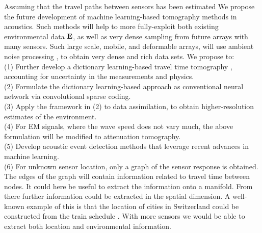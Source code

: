 Assuming that the travel paths between sensors has been estimated\cite{sabra2005,gerstoft2006} We propose the future development of machine learning-based tomography methods in acoustics. Such methods will help to more fully-exploit both existing environmental data $\bf E$, as well as very dense sampling from future arrays with many sensors. Such large scale, mobile, and deformable arrays, will use ambient noise processing \cite{sabra2005}, to obtain very dense and rich data sets. We propose  to: \\
(1) Further develop a dictionary learning-based travel time tomography \cite{bianco2018}, accounting for uncertainty in the measurements and physics. \\
(2) Formulate the dictionary learning-based approach as conventional neural network via convolutional sparse coding. \\
(3) Apply the framework in (2) to  data assimilation, to obtain higher-resolution estimates of the environment. \\
(4) For EM signals, where the wave speed does not vary much, the above formulation will be modified to  attenuation tomography.\\
(5) Develop acoustic event detection methods that leverage recent advances in machine learning.\\
(6) For unknown sensor location, only a graph of the sensor response is obtained. The edges of the graph will contain information related to travel time between nodes. It could here be useful to extract the information onto a manifold. From there further information could be extracted in the spatial dimension. A well-known example of this is that the location of cities in Switzerland could be constructed from the train schedule \cite{dokmanic2015}. With more sensors we would be able to extract both location and environmental information.  


